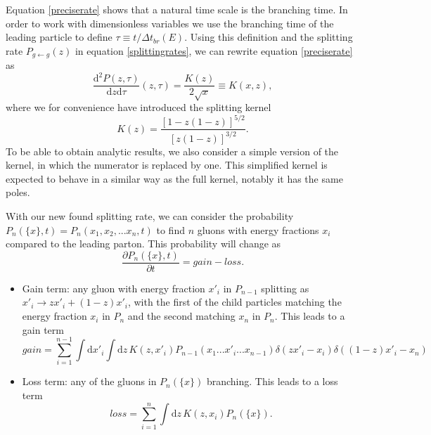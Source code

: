\documentclass[a4paper,12pt]{article}
\newcommand{\party}[2]{\frac{\partial{#1}}{\partial{#2}}}
\numberwithin{equation}{section}
\begin{document}
Equation \eqref{preciserate} shows that a natural time scale is the branching time. In order to work with dimensionless variables we use the branching time of the leading particle to define $\tau \equiv t/\Delta t_{br}(E)$. Using this definition and the splitting rate $P_{g \leftarrow g}(z)$ in equation \eqref{splittingrates}, we can rewrite equation \eqref{preciserate} as
\begin{equation}\label{ratewithkernel}
\frac{\mathrm{d}^2 P(z,\tau)}{\mathrm{d}z\mathrm{d}\tau}(z,\tau)=\frac{K(z)}{2 \sqrt{x}} \equiv K(x,z),
\end{equation}
where we for convenience have introduced the splitting kernel
\begin{equation}\label{kernel}
K(z)=\frac{[1-z(1-z)]^{5/2}}{[z(1-z)]^{3/2}}.
\end{equation}
To be able to obtain analytic results, we also consider a simple version of the kernel, in which the numerator is replaced by one. This simplified kernel is expected to behave in a similar way as the full kernel, notably it has the same poles.

With our new found splitting rate, we can consider the probability ${P_n(\{x\},t)}=P_n(x_1,x_2,...x_n,t)$ to find $n$ gluons with energy fractions $x_i$ compared to the leading parton. This probability will change as
\begin{equation}\label{Pevo}
\party{P_n(\{x\},t)}{t}=gain-loss.
\end{equation}
\begin{itemize}
\item Gain term: any gluon with energy fraction $x'_i$ in $P_{n-1}$ splitting as $x'_i \rightarrow z x'_i + (1-z)x'_i$, with the first of the child particles matching the energy fraction $x_i$ in $P_n$ and the second matching $x_n$ in $P_n$. This leads to a gain term 
\begin{equation}
gain=\sum_{i=1}^{n-1} \int \mathrm{d}x'_i \int \mathrm{d}z\, K(z,x'_i) P_{n-1}(x_1...x'_i...x_{n-1}) \delta(zx'_i-x_i)\delta((1-z)x'_i-x_n)
\end{equation}
\item Loss term: any of the gluons in $P_n(\{x\})$ branching. This leads to a loss term
\begin{equation}
loss=\sum_{i=1}^n \int \mathrm{d}z\, K(z,x_i) P_n(\{x\}).
\end{equation}
\end{itemize} 
\end{document}
